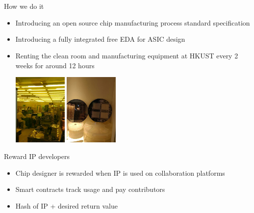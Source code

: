 \documentclass[9pt]{beamer}
\begin{document}
\section[How]{}
\begin{frame}{How we do it}
	\begin{itemize}
		\item Introducing an open source chip manufacturing process standard specification
		\item Introducing a fully integrated free EDA for ASIC design\footnotemark
		\item Renting the clean room and manufacturing equipment at HKUST every 2 weeks for around 12 hours \\		
		\begin{center}
			\includegraphics[height=100pt]{cleanroom.png}
			\includegraphics[height=100pt]{examples.png}
		\end{center}
	\end{itemize}

\end{frame}

\begin{frame}{Reward IP developers}
	\begin{itemize}
        \setlength\itemsep{1em}
		\item Chip designer is rewarded when IP is used on collaboration platforms
		\item Smart contracts track usage and pay contributors
		\item Hash of IP + desired return value
	\end{itemize}
\end{frame}
\end{document}
